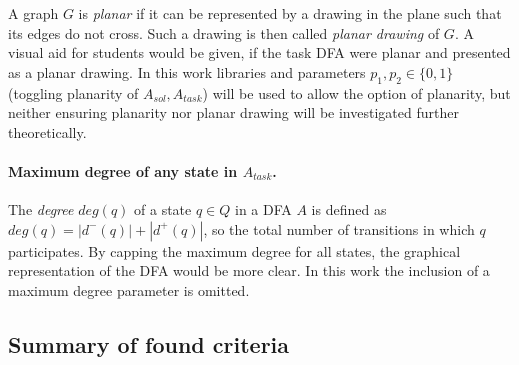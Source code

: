 A graph $G$ is \emph{planar} if it can be represented by a drawing in the plane such that its edges do not cross. Such a drawing is then called \emph{planar drawing} of $G$. A visual aid for students would be given, if the task DFA were planar and presented as a planar drawing. In this work libraries and parameters $p_1, p_2 \in \{0,1\}$ (toggling planarity of $A_{sol}, A_{task}$) will be used to allow the option of planarity, but neither ensuring planarity nor planar drawing will be investigated further theoretically.

\paragraph*{Maximum degree of any state in $A_{task}$.}

The \emph{degree} $deg(q)$ of a state $q \in Q$ in a DFA $A$ is defined as $deg(q) = |d^-(q)| + |d^+(q)|$, so the total number of transitions in which $q$ participates. By capping the maximum degree for all states, the graphical representation of the DFA would be more clear. In this work the inclusion of a maximum degree parameter is omitted.


\subsection{Summary of found criteria}


